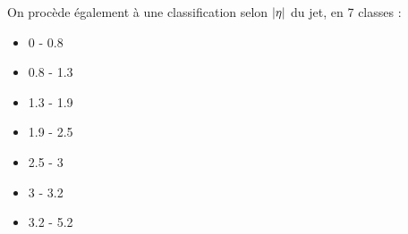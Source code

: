 \bigskip

On procède également à une classification selon $\lvert \eta \rvert$ du jet, en 7 classes :

\begin{multicols}{4}
  \begin{itemize} \setlength{\itemsep}{0.4\itemsep}
      \item \num{0} - \num{0.8}
      \item \num{0.8} - \num{1.3}
      \item \num{1.3} - \num{1.9}
      \item \num{1.9} - \num{2.5}
      \item \num{2.5} - \num{3}
      \item \num{3} - \num{3.2}
      \item \num{3.2} - \num{5.2}
  \end{itemize}
\end{multicols}

